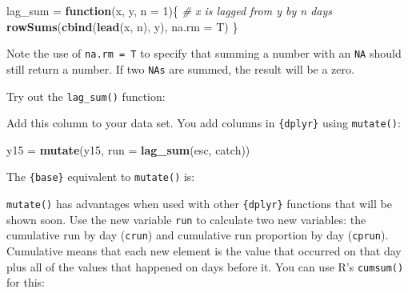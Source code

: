 \documentclass[]{book}
\newenvironment{Shaded}{\begin{snugshade}}{\end{snugshade}}
\newcommand{\CommentTok}[1]{\textcolor[rgb]{0.56,0.35,0.01}{\textit{#1}}}
\newcommand{\ControlFlowTok}[1]{\textcolor[rgb]{0.13,0.29,0.53}{\textbf{#1}}}
\newcommand{\DataTypeTok}[1]{\textcolor[rgb]{0.13,0.29,0.53}{#1}}
\newcommand{\DecValTok}[1]{\textcolor[rgb]{0.00,0.00,0.81}{#1}}
\newcommand{\KeywordTok}[1]{\textcolor[rgb]{0.13,0.29,0.53}{\textbf{#1}}}
\newcommand{\NormalTok}[1]{#1}
\newcommand{\OperatorTok}[1]{\textcolor[rgb]{0.81,0.36,0.00}{\textbf{#1}}}
\newcommand{\StringTok}[1]{\textcolor[rgb]{0.31,0.60,0.02}{#1}}
\begin{document}
\begin{Shaded}
\begin{Highlighting}[]
\NormalTok{lag_sum =}\StringTok{ }\ControlFlowTok{function}\NormalTok{(x, y, }\DataTypeTok{n =} \DecValTok{1}\NormalTok{)\{}
  \CommentTok{# x is lagged from y by n days}
  \KeywordTok{rowSums}\NormalTok{(}\KeywordTok{cbind}\NormalTok{(}\KeywordTok{lead}\NormalTok{(x, n), y), }\DataTypeTok{na.rm =}\NormalTok{ T)}
\NormalTok{\}}
\end{Highlighting}
\end{Shaded}

Note the use of \texttt{na.rm\ =\ T} to specify that summing a number with an \texttt{NA} should still return a number. If two \texttt{NAs} are summed, the result will be a zero.

Try out the \texttt{lag\_sum()} function:

\begin{Shaded}
\end{Shaded}

Add this column to your data set. You add columns in \texttt{\{dplyr\}} using \texttt{mutate()}:

\begin{Shaded}
\begin{Highlighting}[]
\NormalTok{y15 =}\StringTok{ }\KeywordTok{mutate}\NormalTok{(y15, }\DataTypeTok{run =} \KeywordTok{lag_sum}\NormalTok{(esc, catch))}
\end{Highlighting}
\end{Shaded}

The \texttt{\{base\}} equivalent to \texttt{mutate()} is:

\begin{Shaded}
\end{Shaded}

\texttt{mutate()} has advantages when used with other \texttt{\{dplyr\}} functions that will be shown soon. Use the new variable \texttt{run} to calculate two new variables: the cumulative run by day (\texttt{crun}) and cumulative run proportion by day (\texttt{cprun}). Cumulative means that each new element is the value that occurred on that day plus all of the values that happened on days before it. You can use R's \texttt{cumsum()} for this:
\end{document}
